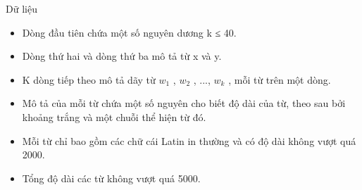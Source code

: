 Dữ liệu  
\begin{itemize}
	\item     Dòng đầu tiên chứa một số nguyên dương k ≤ 40.   
	\item     Dòng thứ hai và dòng thứ ba mô tả từ x và y.   
	\item     K dòng tiếp theo mô tả dãy từ $w_{1}$    , $w_{2}$    , ..., $w_{k}$    , mỗi từ trên một dòng.   
	\item     Mô tả của mỗi từ chứa một số nguyên cho biết độ dài của từ, theo sau bởi khoảng trắng và một chuỗi thể hiện từ đó.   
	\item     Mỗi từ chỉ bao gồm các chữ cái Latin in thường và có độ dài không vượt quá 2000.   
	\item     Tổng độ dài các từ không vượt quá 5000.   
\end{itemize}